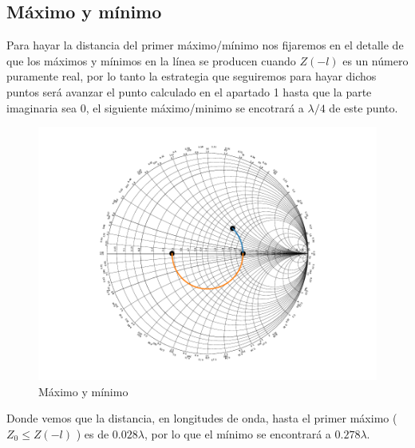 \subsection{Máximo y mínimo}
Para hayar la distancia del primer máximo/mínimo nos fijaremos en el detalle de que los máximos y mínimos en la línea se producen cuando $Z(-l)$ es un número puramente real, por lo tanto la estrategia que seguiremos para hayar dichos puntos será avanzar el punto calculado en el apartado 1 hasta que la parte imaginaria sea 0, el siguiente máximo/minimo se encotrará a $\lambda / 4$ de este punto.
\begin{figure}[h]
  \centering
  \includegraphics{ej7/images/out4.pdf}
  \caption{Máximo y mínimo}
  \label{ej2smith}
\end{figure}
Donde vemos que la distancia, en longitudes de onda, hasta el primer máximo ($Z_0 \leq Z(-l)$ ) es de $0.028\lambda$, por lo que el mínimo se encontrará a $0.278\lambda$.
